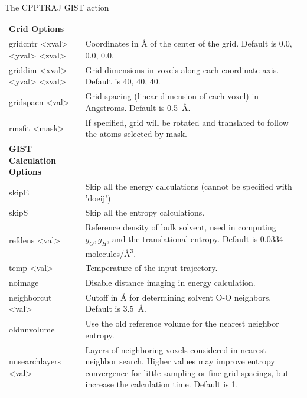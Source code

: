 \documentclass[9pt,tutorial]{livecoms}
\begin{document}
\begin{Checklists*}[h!]
\begin{checklist}{The CPPTRAJ GIST action}
\begin{tabularx}{\textwidth}{@{}l X @{} }
\textbf{Grid Options} &\\
gridcntr <xval> <yval> <zval> & Coordinates in \AA{} of the center of the grid. Default is 0.0, 0.0, 0.0. \\
griddim <xval> <yval> <zval> & Grid dimensions in voxels along each coordinate axis. Default is 40, 40, 40.\\
gridspacn <val> & Grid spacing (linear dimension of each voxel) in 
Angstroms. Default is \SI{0.5}{\angstrom}.\\
rmsfit <mask> & If specified, grid will be rotated and translated to follow the atoms selected by mask. \\
\textbf{GIST Calculation Options} &\\

skipE & Skip all the energy calculations (cannot be specified with ’doeij’)\\
skipS & Skip all the entropy calculations.\\
refdens <val> & Reference density of bulk solvent, used in computing 
$g_O, g_H$, and the translational entropy. Default is 0.0334 molecules/\si{\cubic\angstrom}. \\
temp <val> & Temperature of the input trajectory. \\
noimage &  Disable distance imaging in energy calculation. \\

neighborcut <val> & Cutoff in \si{\angstrom} for determining solvent O-O neighbors. Default is \SI{3.5}{\angstrom}. \\

oldnnvolume & Use the old reference volume for the nearest neighbor entropy. \\

nnsearchlayers <val> & Layers of neighboring voxels considered in nearest neighbor search. Higher values may improve entropy convergence for little sampling or fine grid spacings, but increase the calculation time. Default is 1. \\


\end{tabularx}
\end{checklist}
\end{Checklists*}
\end{document}

